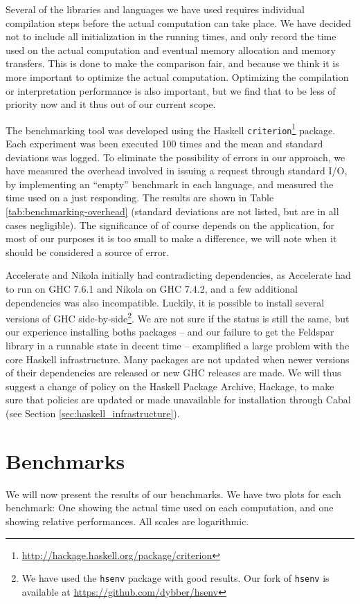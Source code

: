 Several of the libraries and languages we have used requires
individual compilation steps before the actual computation can take
place. We have decided not to include all initialization in the
running times, and only record the time used on the actual computation
and eventual memory allocation and memory transfers. This is done to make the
comparison fair, and because we think it is more important to optimize
the actual computation. Optimizing the compilation or interpretation
performance is also important, but we find that to be less of priority
now and it thus out of our current scope.

The benchmarking tool was developed using the Haskell
\texttt{criterion}\footnote{\url{http://hackage.haskell.org/package/criterion}}
package. Each experiment was been executed 100 times and the mean and
standard deviations was logged. To eliminate the possibility of errors
in our approach, we have measured the overhead involved in issuing a
request through standard I/O, by implementing an ``empty'' benchmark
in each language, and measured the time used on a just responding. The
results are shown in Table \ref{tab:benchmarking-overhead} (standard
deviations are not listed, but are in all cases negligible). The
significance of of course depends on the application, for most of our
purposes it is too small to make a difference, we will note when it
should be considered a source of error.

Accelerate and Nikola initially had contradicting dependencies, as
Accelerate had to run on GHC 7.6.1 and Nikola on GHC 7.4.2, and a few
additional dependencies was also incompatible. Luckily, it is possible
to install several versions of GHC side-by-side\footnote{We have used
  the \texttt{hsenv} package with good results. Our fork of
  \texttt{hsenv} is available at
  \url{https://github.com/dybber/hsenv}}. We are not sure if the
status is still the same, but our experience installing boths packages
-- and our failure to get the Feldspar library in a runnable state in
decent time -- examplified a large problem with the core Haskell
infrastructure. Many packages are not updated when newer versions of
their dependencies are released or new GHC releases are made. We will
thus suggest a change of policy on the Haskell Package Archive,
Hackage, to make sure that policies are updated or made unavailable
for installation through Cabal (see Section
\ref{sec:haskell_infrastructure}).


\section{Benchmarks}
We will now present the results of our benchmarks. We have two plots
for each benchmark: One showing the actual time used on each
computation, and one showing relative performances. All scales are
logarithmic.

